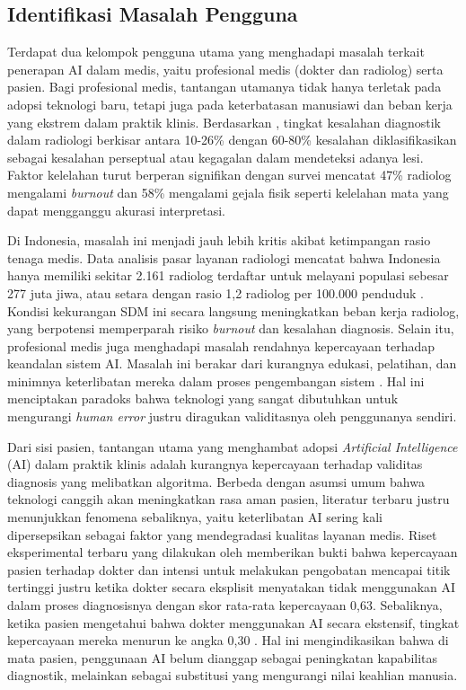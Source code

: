 \subsection{Identifikasi Masalah Pengguna}
Terdapat dua kelompok pengguna utama yang menghadapi masalah terkait penerapan AI dalam medis, yaitu profesional medis (dokter dan radiolog) serta pasien.
Bagi profesional medis, tantangan utamanya tidak hanya terletak pada adopsi teknologi baru, tetapi juga pada keterbatasan manusiawi dan beban kerja yang ekstrem dalam praktik klinis. Berdasarkan \textcite{zhang2023diagnostic}, tingkat kesalahan diagnostik dalam radiologi berkisar antara 10-26\% dengan 60-80\% kesalahan  diklasifikasikan sebagai kesalahan perseptual atau kegagalan dalam mendeteksi adanya lesi. Faktor kelelahan turut berperan signifikan dengan survei mencatat 47\% radiolog mengalami \textit{burnout} dan 58\% mengalami gejala fisik seperti kelelahan mata yang dapat mengganggu akurasi interpretasi.

Di Indonesia, masalah ini menjadi jauh lebih kritis akibat ketimpangan rasio tenaga medis. Data analisis pasar layanan radiologi mencatat bahwa Indonesia hanya memiliki sekitar 2.161 radiolog terdaftar untuk melayani populasi sebesar 277 juta jiwa, atau setara dengan rasio 1,2 radiolog per 100.000 penduduk \autocite{insights102023indonesia}. Kondisi kekurangan SDM ini secara langsung meningkatkan beban kerja radiolog, yang berpotensi memperparah risiko \textit{burnout} dan kesalahan diagnosis. Selain itu,
profesional medis juga menghadapi masalah rendahnya kepercayaan terhadap keandalan sistem AI. Masalah ini berakar dari kurangnya edukasi, pelatihan, dan minimnya keterlibatan mereka dalam proses pengembangan sistem \autocite{syaftahan2025transformasi}. Hal ini menciptakan paradoks bahwa teknologi yang sangat dibutuhkan untuk mengurangi \textit{human error} justru diragukan validitasnya oleh penggunanya sendiri.

Dari sisi pasien, tantangan utama yang menghambat adopsi \textit{Artificial Intelligence} (AI) dalam praktik klinis adalah kurangnya kepercayaan terhadap validitas diagnosis yang melibatkan algoritma. Berbeda dengan asumsi umum bahwa teknologi canggih akan meningkatkan rasa aman pasien, literatur terbaru justru menunjukkan fenomena sebaliknya, yaitu keterlibatan AI sering kali dipersepsikan sebagai faktor yang mendegradasi kualitas layanan medis.
Riset eksperimental terbaru yang dilakukan oleh \textcite{chen2025impact} memberikan bukti bahwa kepercayaan pasien terhadap dokter dan intensi untuk melakukan pengobatan mencapai titik tertinggi justru ketika dokter secara eksplisit menyatakan tidak menggunakan AI dalam proses diagnosisnya dengan skor rata-rata kepercayaan 0,63. Sebaliknya, ketika pasien mengetahui bahwa dokter menggunakan AI secara ekstensif, tingkat kepercayaan mereka menurun ke angka 0,30 \autocite{chen2025impact}. Hal ini mengindikasikan bahwa di mata pasien, penggunaan AI belum dianggap sebagai peningkatan kapabilitas diagnostik, melainkan sebagai substitusi yang mengurangi nilai keahlian manusia.

